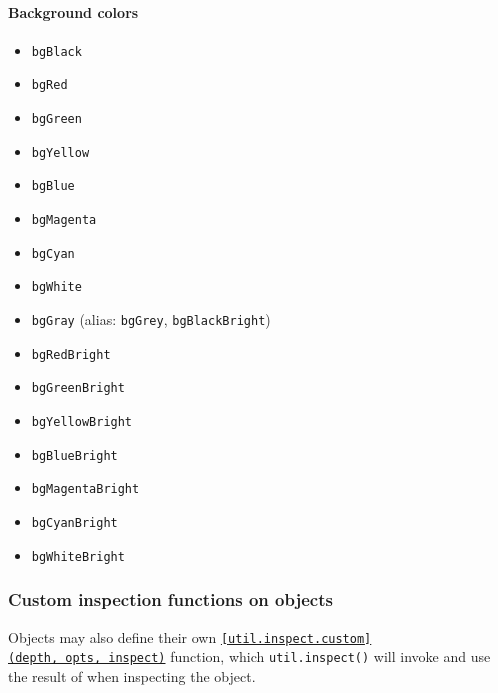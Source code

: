 \paragraph{Background colors}\label{background-colors}

\begin{itemize}
\tightlist
\item
  \texttt{bgBlack}
\item
  \texttt{bgRed}
\item
  \texttt{bgGreen}
\item
  \texttt{bgYellow}
\item
  \texttt{bgBlue}
\item
  \texttt{bgMagenta}
\item
  \texttt{bgCyan}
\item
  \texttt{bgWhite}
\item
  \texttt{bgGray} (alias: \texttt{bgGrey}, \texttt{bgBlackBright})
\item
  \texttt{bgRedBright}
\item
  \texttt{bgGreenBright}
\item
  \texttt{bgYellowBright}
\item
  \texttt{bgBlueBright}
\item
  \texttt{bgMagentaBright}
\item
  \texttt{bgCyanBright}
\item
  \texttt{bgWhiteBright}
\end{itemize}

\subsubsection{Custom inspection functions on
objects}\label{custom-inspection-functions-on-objects}

Objects may also define their own
\hyperref[utilinspectcustom]{\texttt{{[}util.inspect.custom{]}(depth,\ opts,\ inspect)}}
function, which \texttt{util.inspect()} will invoke and use the result
of when inspecting the object.

